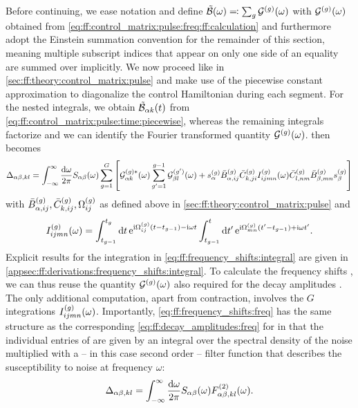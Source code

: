 Before continuing, we ease notation and define $\tilde{\mathcal{B}}(\omega) \eqqcolon \sum_g\mathcal{G}^{(g)}(\omega)$ with $\mathcal{G}^{(g)}(\omega)$ obtained from \cref{eq:ff:control_matrix:pulse:freq:ff:calculation} and furthermore adopt the Einstein summation convention for the remainder of this section, meaning multiple subscript indices that appear on only one side of an equality are summed over implicitly.
We now proceed like in \cref{sec:ff:theory:control_matrix:pulse} and make use of the piecewise constant approximation to diagonalize the control Hamiltonian during each segment.
For the nested integrals, we obtain $\tilde{\mathcal{B}}_{\alpha k}(t)$ from \cref{eq:ff:control_matrix:pulse:time:piecewise}, whereas the remaining integrals factorize and we can identify the Fourier transformed quantity $\mathcal{G}^{(g)}(\omega)$.
 then becomes
\begin{equation}\label{eq:ff:frequency_shifts:freq}
    \Delta_{\alpha\beta,kl} = \int_{-\infty}^\infty\frac{\dd{\omega}}{2\pi} S_{\alpha\beta}(\omega)\sum_{g=1}^G\left[
        \mathcal{G}_{\alpha k}^{(g)\ast}(\omega)\sum_{g'=1}^{g-1}\mathcal{G}_{\beta l}^{(g')}(\omega) +
        s_\alpha^{(g)}\bar{B}_{\alpha,ij}^{(g)}\bar{C}_{k,ji}^{(g)} I_{ijmn}^{(g)}(\omega)
        \bar{C}_{l,nm}^{(g)}\bar{B}_{\beta,mn}^{(g)} s_\beta^{(g)}
    \right]
\end{equation}
with $\bar{B}_{\alpha,ij}^{(g)},\bar{C}_{k,ij}^{(g)},\Omega_{ij}^{(g)}$ as defined above in \cref{sec:ff:theory:control_matrix:pulse} and
\begin{equation}\label{eq:ff:frequency_shifts:integral}
    I_{ijmn}^{(g)}(\omega) = \int_{t_{g-1}}^{t_g}\dd{t}\mathrm{e}^{\mathrm{i}\Omega_{ij}^{(g)}(t - t_{g-1}) - \mathrm{i}\omega t}
                              \int_{t_{g-1}}^{t}\dd{t'}\mathrm{e}^{\mathrm{i}\Omega_{mn}^{(g)}(t' - t_{g-1}) + \mathrm{i}\omega t'}.
\end{equation}
Explicit results for the integration in \cref{eq:ff:frequency_shifts:integral} are given in \cref{appsec:ff:derivations:frequency_shifts:integral}.
To calculate the frequency shifts \freqshifts, we can thus reuse the quantity $\mathcal{G}^{(g)}(\omega)$ also required for the decay amplitudes \decayamps.
The only additional computation, apart from contraction, involves the $G$ integrations $I_{ijmn}^{(g)}(\omega)$.
Importantly, \cref{eq:ff:frequency_shifts:freq} has the same structure as the corresponding \cref{eq:ff:decay_amplitudes:freq} for \decayamps in that the individual entries of \freqshifts are given by an integral over the spectral density of the noise multiplied with a -- in this case second order -- filter function that describes the susceptibility to noise at frequency $\omega$:
\begin{equation}\label{eq:ff:frequency_shifts:filter_function}
    \Delta_{\alpha\beta,kl} = \int_{-\infty}^\infty\frac{\dd{\omega}}{2\pi} S_{\alpha\beta}(\omega) F_{\alpha\beta,kl}^{(2)}(\omega).
\end{equation}


